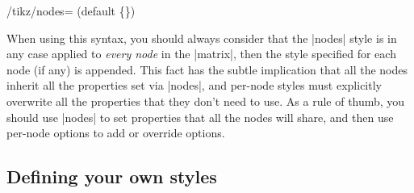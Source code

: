 \documentclass[a4paper]{ltxdoc}
\begin{document}
\begin{stylekey}{/tikz/nodes= (default \{\})}
{\begin{codeexample}[]
\begin{dependency}[edge style={green!60!black,very thick}, 
   label style={fill=blue!60,font=\bfseries,text=white}]
\end{dependency}
\end{codeexample}
}
When using this syntax, you should always consider that the |nodes| style is in any case applied to \emph{every node} in the |matrix|, then the style specified for each node (if any) is appended. This fact has the subtle implication that all the nodes inherit all the properties set via |nodes|, and per-node styles must explicitly overwrite all the properties that they don't need to use. As a rule of thumb, you should use |nodes| to set properties that all the nodes will share, and then use per-node options to add or override options.
\end{stylekey}

\subsection{Defining your own styles}
\end{document}
